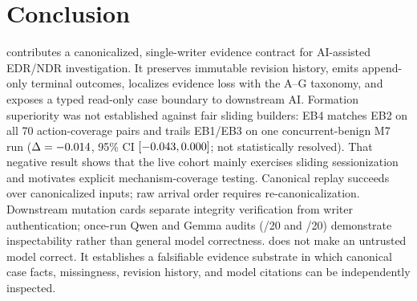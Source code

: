 \section{Conclusion}
\label{sec:conclusion}

\begin{sloppypar}
\trustepisode contributes a canonicalized, single-writer evidence contract for AI-assisted EDR/NDR
investigation. It preserves immutable revision history, emits append-only terminal outcomes,
localizes evidence loss with the A--G taxonomy, and exposes a typed read-only case boundary to
downstream AI. Formation superiority was not established against fair sliding builders: EB4 matches
EB2 on all 70 action-coverage pairs and trails EB1/EB3 on one concurrent-benign M7 run
($\Delta=-0.014{}$, 95\% CI $[-0.043{},0.000{}]$; not statistically
resolved). That negative result shows that the live cohort mainly exercises sliding sessionization
and motivates explicit mechanism-coverage testing. Canonical replay succeeds over canonicalized
inputs; raw arrival order requires re-canonicalization. Downstream mutation cards separate integrity
verification from writer authentication; once-run Qwen and Gemma audits (\LlmPilotExact{}/20 and
\GemmaPilotExact{}/20) demonstrate inspectability rather than general model correctness.
\trustepisode does not make an untrusted model correct. It establishes a falsifiable evidence
substrate in which canonical case facts, missingness, revision history, and model citations can be
independently inspected.
\end{sloppypar}
